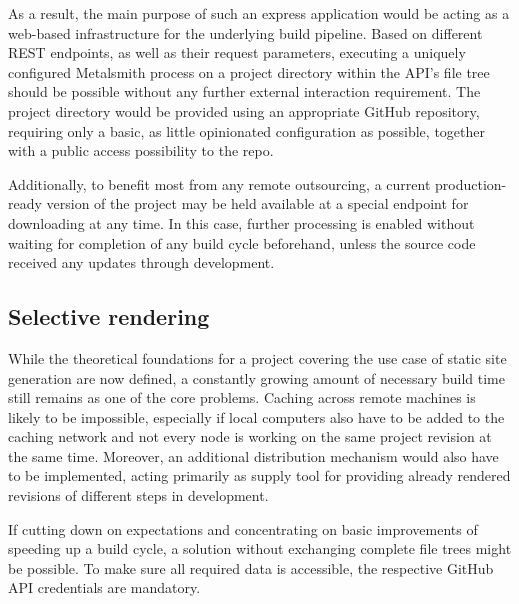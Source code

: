 

As a result, the main purpose of such an express application would be acting as a web-based infrastructure for the underlying build pipeline. Based on different REST endpoints, as well as their request parameters, executing a uniquely configured Metalsmith process on a project directory within the API's file tree should be possible without any further external interaction requirement. The project directory would be provided using an appropriate GitHub repository, requiring only a basic, as little opinionated configuration as possible, together with a public access possibility to the repo.

Additionally, to benefit most from any remote outsourcing, a current production-ready version of the project may be held available at a special endpoint for downloading at any time. In this case, further processing is enabled without waiting for completion of any build cycle beforehand, unless the source code received any updates through development.


\subsection{Selective rendering}
\label{sec:primarythoughts-rendering}

While the theoretical foundations for a project covering the use case of static site generation are now defined, a constantly growing amount of necessary build time still remains as one of the core problems. Caching across remote machines is likely to be impossible, especially if local computers also have to be added to the caching network and not every node is working on the same project revision at the same time. Moreover, an additional distribution mechanism would also have to be implemented, acting primarily as supply tool for providing already rendered revisions of different steps in development.

If cutting down on expectations and concentrating on basic improvements of speeding up a build cycle, a solution without exchanging complete file trees might be possible. To make sure all required data is accessible, the respective GitHub API credentials are mandatory.
